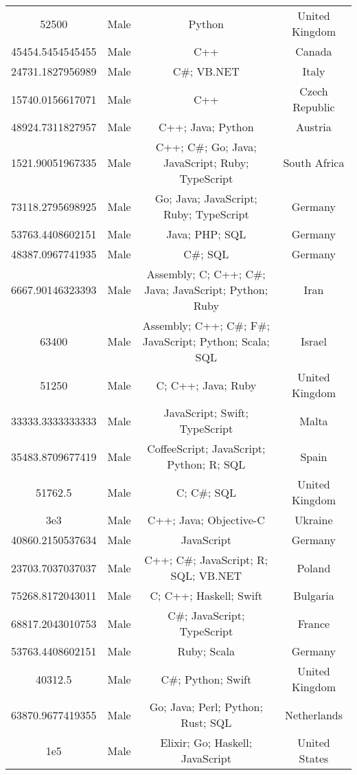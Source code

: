 \begin{center}
\begin{tabular}{ |c|c|c|c| }
52500  &  Male  &  Python  &  United Kingdom  \\ 
45454.5454545455  &  Male  &  C++  &  Canada  \\ 
24731.1827956989  &  Male  &  C\#; VB.NET  &  Italy  \\ 
15740.0156617071  &  Male  &  C++  &  Czech Republic  \\ 
48924.7311827957  &  Male  &  C++; Java; Python  &  Austria  \\ 
1521.90051967335  &  Male  &  C++; C\#; Go; Java; JavaScript; Ruby; TypeScript  &  South Africa  \\ 
73118.2795698925  &  Male  &  Go; Java; JavaScript; Ruby; TypeScript  &  Germany  \\ 
53763.4408602151  &  Male  &  Java; PHP; SQL  &  Germany  \\ 
48387.0967741935  &  Male  &  C\#; SQL  &  Germany  \\ 
6667.90146323393  &  Male  &  Assembly; C; C++; C\#; Java; JavaScript; Python; Ruby  &  Iran  \\ 
63400  &  Male  &  Assembly; C++; C\#; F\#; JavaScript; Python; Scala; SQL  &  Israel  \\ 
51250  &  Male  &  C; C++; Java; Ruby  &  United Kingdom  \\ 
33333.3333333333  &  Male  &  JavaScript; Swift; TypeScript  &  Malta  \\ 
35483.8709677419  &  Male  &  CoffeeScript; JavaScript; Python; R; SQL  &  Spain  \\ 
51762.5  &  Male  &  C; C\#; SQL  &  United Kingdom  \\ 
3e3  &  Male  &  C++; Java; Objective-C  &  Ukraine  \\ 
40860.2150537634  &  Male  &  JavaScript  &  Germany  \\ 
23703.7037037037  &  Male  &  C++; C\#; JavaScript; R; SQL; VB.NET  &  Poland  \\ 
75268.8172043011  &  Male  &  C; C++; Haskell; Swift  &  Bulgaria  \\ 
68817.2043010753  &  Male  &  C\#; JavaScript; TypeScript  &  France  \\ 
53763.4408602151  &  Male  &  Ruby; Scala  &  Germany  \\ 
40312.5  &  Male  &  C\#; Python; Swift  &  United Kingdom  \\ 
63870.9677419355  &  Male  &  Go; Java; Perl; Python; Rust; SQL  &  Netherlands  \\ 
1e5  &  Male  &  Elixir; Go; Haskell; JavaScript  &  United States  \\ 

\end{tabular}
\end{center}
